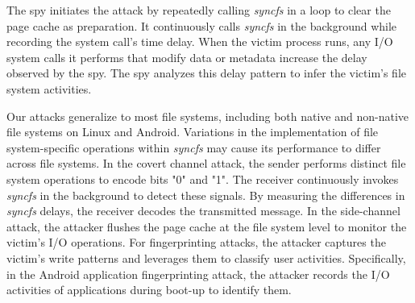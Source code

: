 The spy initiates the attack by repeatedly calling \textit{syncfs} in a loop to clear the page cache as preparation. It continuously calls \textit{syncfs} in the background while recording the system call's time delay. When the victim process runs, any I/O system calls it performs that modify data or metadata increase the delay observed by the spy. The spy analyzes this delay pattern to infer the victim's file system activities. 


Our attacks generalize to most file systems, including both native and non-native file systems on Linux and Android. Variations in the implementation of file system-specific operations within \textit{syncfs} may cause its performance to differ across file systems.
In the covert channel attack, the sender performs distinct file system operations to encode bits "0" and "1". The receiver continuously invokes \textit{syncfs} in the background to detect these signals. By measuring the differences in \textit{syncfs} delays, the receiver decodes the transmitted message.
In the side-channel attack, the attacker flushes the page cache at the file system level to monitor the victim's I/O operations. For fingerprinting attacks, the attacker captures the victim's write patterns and leverages them to classify user activities. Specifically, in the Android application fingerprinting attack, the attacker records the I/O activities of applications during boot-up to identify them.












